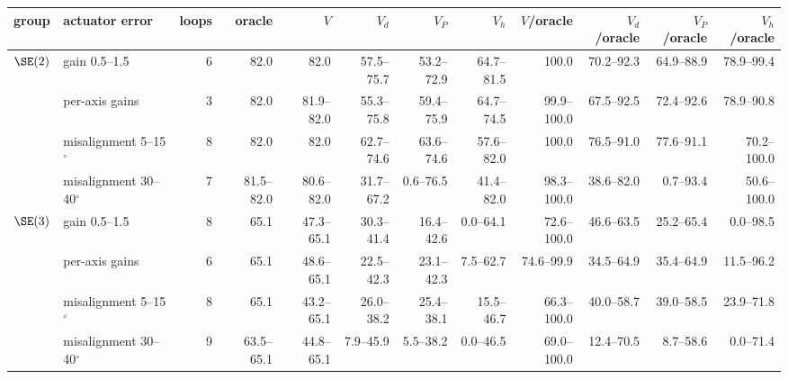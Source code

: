 \begin{tabular}{@{}llrrrrrrrrrr@{}}
\toprule
group & actuator error & loops & oracle & $V$ & $V_d$ & $V_P$ & $V_h$ & $V$/oracle & $V_d$/oracle & $V_P$/oracle & $V_h$/oracle \\
\midrule
$\SE(2)$ & gain 0.5--1.5 & 6 & 82.0 & 82.0 & 57.5--75.7 & 53.2--72.9 & 64.7--81.5 & 100.0 & 70.2--92.3 & 64.9--88.9 & 78.9--99.4 \\
 & per-axis gains & 3 & 82.0 & 81.9--82.0 & 55.3--75.8 & 59.4--75.9 & 64.7--74.5 & 99.9--100.0 & 67.5--92.5 & 72.4--92.6 & 78.9--90.8 \\
 & misalignment 5--15$^\circ$ & 8 & 82.0 & 82.0 & 62.7--74.6 & 63.6--74.6 & 57.6--82.0 & 100.0 & 76.5--91.0 & 77.6--91.1 & 70.2--100.0 \\
 & misalignment 30--40$^\circ$ & 7 & 81.5--82.0 & 80.6--82.0 & 31.7--67.2 & 0.6--76.5 & 41.4--82.0 & 98.3--100.0 & 38.6--82.0 & 0.7--93.4 & 50.6--100.0 \\
\midrule
$\SE(3)$ & gain 0.5--1.5 & 8 & 65.1 & 47.3--65.1 & 30.3--41.4 & 16.4--42.6 & 0.0--64.1 & 72.6--100.0 & 46.6--63.5 & 25.2--65.4 & 0.0--98.5 \\
 & per-axis gains & 6 & 65.1 & 48.6--65.1 & 22.5--42.3 & 23.1--42.3 & 7.5--62.7 & 74.6--99.9 & 34.5--64.9 & 35.4--64.9 & 11.5--96.2 \\
 & misalignment 5--15$^\circ$ & 8 & 65.1 & 43.2--65.1 & 26.0--38.2 & 25.4--38.1 & 15.5--46.7 & 66.3--100.0 & 40.0--58.7 & 39.0--58.5 & 23.9--71.8 \\
 & misalignment 30--40$^\circ$ & 9 & 63.5--65.1 & 44.8--65.1 & 7.9--45.9 & 5.5--38.2 & 0.0--46.5 & 69.0--100.0 & 12.4--70.5 & 8.7--58.6 & 0.0--71.4 \\
\bottomrule
\end{tabular}
